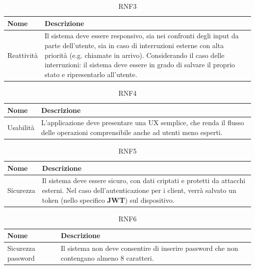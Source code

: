 \documentclass{natourDoc}
\begin{document}
\begin{table}[H]
	\centering
	\begin{tabular}{ |p{5cm}|p{10.3cm}| }
		\hline
		\rowcolor{PineGreen!70}
		\textbf{Nome} & \textbf{Descrizione}                                                                                             \\
		\hline
		Reattività    & Il sistema deve essere responsivo, sia nei confronti degli input da parte dell'utente, sia
		in caso di interruzioni esterne con alta priorità (e.g. chiamate in arrivo).
		Considerando il caso delle interruzioni: il sistema deve essere in grado di salvare il proprio stato e ripresentarlo all'utente. \\
		\hline
	\end{tabular}
	\caption{RNF3}
\end{table}

\begin{table}[H]
	\centering
	\begin{tabular}{ |p{5cm}|p{10.3cm}| }
		\hline
		\rowcolor{PineGreen!70}
		\textbf{Nome} & \textbf{Descrizione}                                                                          \\
		\hline
		Usabilità     & L'applicazione deve presentare una \Gls{UX} semplice, che renda il flusso delle operazioni
		comprensibile anche ad utenti meno esperti.                                                                   \\
		\hline
	\end{tabular}
	\caption{RNF4}
\end{table}

\begin{table}[H]
	\centering
	\begin{tabular}{ |p{5cm}|p{10.3cm}| }
		\hline
		\rowcolor{PineGreen!70}
		\textbf{Nome} & \textbf{Descrizione}                                                                              \\
		\hline
		Sicurezza     & Il sistema deve essere sicuro, con dati criptati e protetti da attacchi esterni.
		Nel caso dell'autenticazione per i client, verrà salvato un token (nello specifico \textbf{\Gls{JWT}}) sul dispositivo. \\
		\hline
	\end{tabular}
	\caption{RNF5}
\end{table}

\begin{table}[H]
	\centering
	\begin{tabular}{ |p{5cm}|p{10.3cm}| }
		\hline
		\rowcolor{PineGreen!70}
		\textbf{Nome}      & \textbf{Descrizione}                                                   \\
		\hline
		Sicurezza password & Il sistema non deve consentire di inserire password che non contengano
		almeno 8 caratteri.                                                                         \\
		\hline
	\end{tabular}
	\caption{RNF6}
\end{table}
\end{document}
